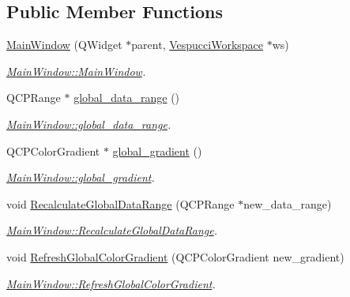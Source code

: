 \subsection*{Public Member Functions}
\begin{DoxyCompactItemize}
\item 
\hyperlink{class_main_window_ab87cdab2f1b7c709fc0f8bca4cf09ebc}{Main\+Window} (Q\+Widget $\ast$parent, \hyperlink{class_vespucci_workspace}{Vespucci\+Workspace} $\ast$ws)
\begin{DoxyCompactList}\small\item\em \hyperlink{class_main_window_ab87cdab2f1b7c709fc0f8bca4cf09ebc}{Main\+Window\+::\+Main\+Window}. \end{DoxyCompactList}\item 
Q\+C\+P\+Range $\ast$ \hyperlink{class_main_window_a89e2dbed5fa59653909d8cd2195c67be}{global\+\_\+data\+\_\+range} ()
\begin{DoxyCompactList}\small\item\em \hyperlink{class_main_window_a89e2dbed5fa59653909d8cd2195c67be}{Main\+Window\+::global\+\_\+data\+\_\+range}. \end{DoxyCompactList}\item 
Q\+C\+P\+Color\+Gradient $\ast$ \hyperlink{class_main_window_abe4c08852fad9c895a712dcd22ac9bd5}{global\+\_\+gradient} ()
\begin{DoxyCompactList}\small\item\em \hyperlink{class_main_window_abe4c08852fad9c895a712dcd22ac9bd5}{Main\+Window\+::global\+\_\+gradient}. \end{DoxyCompactList}\item 
void \hyperlink{class_main_window_a58206491beb13daf24f3ba72e5eebbc0}{Recalculate\+Global\+Data\+Range} (Q\+C\+P\+Range $\ast$new\+\_\+data\+\_\+range)
\begin{DoxyCompactList}\small\item\em \hyperlink{class_main_window_a58206491beb13daf24f3ba72e5eebbc0}{Main\+Window\+::\+Recalculate\+Global\+Data\+Range}. \end{DoxyCompactList}\item 
void \hyperlink{class_main_window_a004bb70b988b902f0e1618bdb2695960}{Refresh\+Global\+Color\+Gradient} (Q\+C\+P\+Color\+Gradient new\+\_\+gradient)
\begin{DoxyCompactList}\small\item\em \hyperlink{class_main_window_a004bb70b988b902f0e1618bdb2695960}{Main\+Window\+::\+Refresh\+Global\+Color\+Gradient}. \end{DoxyCompactList}\item 

\end{DoxyCompactItemize}
